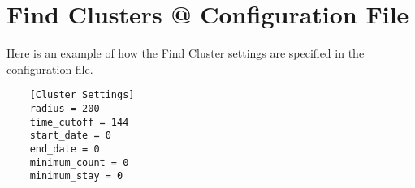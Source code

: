 \FloatBarrier

\section{Find Clusters @ Configuration File}

Here is an example of how the Find Cluster settings are specified
in the configuration file.

\begin{verbatim}
    [Cluster_Settings]
    radius = 200
    time_cutoff = 144
    start_date = 0
    end_date = 0
    minimum_count = 0
    minimum_stay = 0
\end{verbatim}
